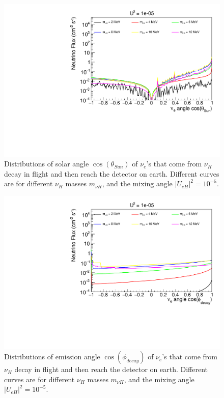 \documentclass[%
 reprint,
 amsmath,amssymb,
 aps,
 prd,
floatfix,
twocolumn,
]{revtex4-1}
\begin{document}
\begin{figure}[!htbp]
\includegraphics[width=0.99\columnwidth]{../plots/DecayInFlightNuLCosthetaSun_U1e-05_AllMass_linXlogY.pdf}
\caption{Distributions of solar angle $\cos(\theta_{Sun})$ of $\nu_e$'s that come from $\nu_H$ decay in flight and then reach the detector on earth. Different curves are for different $\nu_H$ masses $m_{\nu H}$, and the mixing angle $|U_{eH}|^2 = 10^{-5}$.}
\label{fig:DecayInFlightTheta_U1em5_AllMass}
\end{figure}

\begin{figure}[!htbp]
\includegraphics[width=0.99\columnwidth]{../plots/DecayInFlightNuLCosphiSun_U1e-05_AllMass_linXlogY.pdf}
\caption{Distributions of emission angle $\cos(\phi_{decay})$ of $\nu_e$'s that come from $\nu_H$ decay in flight and then reach the detector on earth. Different curves are for different $\nu_H$ masses $m_{\nu H}$, and the mixing angle $|U_{eH}|^2 = 10^{-5}$.}
\label{fig:DecayInFlightPhi_U1em5_AllMass}
\end{figure}
\end{document}

